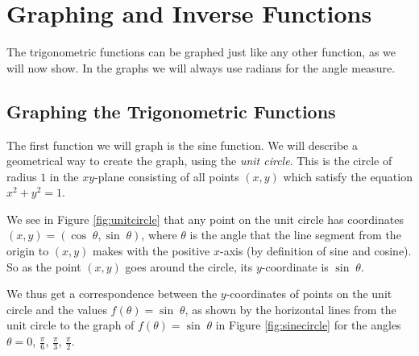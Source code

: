 \chapter{Graphing and Inverse Functions}
The trigonometric functions can be graphed just like any other function, as we will now show.
In the graphs we will always use radians for the angle measure.

\section{Graphing the Trigonometric Functions}
\piccaption[]{\label{fig:unitcircle}}
The first function we will graph is the sine function. We will describe a geometrical way to
create the graph, using the \emph{unit circle}. This is the
circle of radius $1$ in the $xy$-plane consisting of all points $(x,y)$ which satisfy the equation
$x^2 + y^2 = 1$.

We see in Figure \ref{fig:unitcircle} that any point on the unit circle has coordinates
$(x,y)=(\cos\;\theta,\sin\;\theta)$, where $\theta$ is the angle that the line segment from the
origin to $(x,y)$ makes with the positive $x$-axis (by definition of sine and cosine).
So as the point $(x,y)$ goes around the circle, its $y$-coordinate is $\sin\;\theta$.

We thus get a correspondence between the $y$-coordinates of points on the unit circle and the
values $f(\theta)=\sin\;\theta$, as shown by the horizontal lines from the unit circle to the graph
of $f(\theta)=\sin\;\theta$ in Figure \ref{fig:sinecircle} for the angles $\theta = 0$,
$\tfrac{\pi}{6}$, $\tfrac{\pi}{3}$, $\tfrac{\pi}{2}$.

